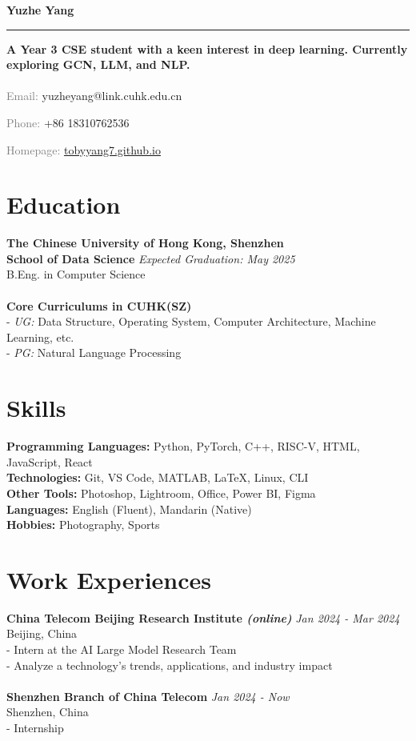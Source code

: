 \documentclass[a4paper,10pt]{article}
\newcommand{\name}[1]{\noindent\textbf{\LARGE #1}\vspace{0.5em}\hrule\vspace{1em}}
\newcommand{\contact}[2]{\noindent\textcolor{gray}{#1:} #2\par}
\begin{document}
\name{Yuzhe Yang}

\textbf{A Year 3 CSE student with a keen interest in deep learning. Currently exploring GCN, LLM, and NLP.\\}
\\
\contact{Email}{yuzheyang@link.cuhk.edu.cn}
\contact{Phone}{+86 18310762536}
\contact{Homepage}{\href{https://tobyyang7.github.io/}{tobyyang7.github.io}}

\section*{Education}
\textbf{The Chinese University of Hong Kong, Shenzhen\\ \textbf{School of Data Science}} \hfill \textit{Expected Graduation: May 2025}\\
B.Eng. in Computer Science\\
\\
\textbf{Core Curriculums in CUHK(SZ)}
\\- \textit{UG:} Data Structure, Operating System, Computer Architecture, Machine Learning, etc.
\\- \textit{PG:} Natural Language Processing


\section*{Skills}
\textbf{Programming Languages:} Python, PyTorch, C++, RISC-V, HTML, JavaScript, React\\
\textbf{Technologies:} Git, VS Code, MATLAB, \LaTeX, Linux, CLI\\
\textbf{Other Tools:} Photoshop, Lightroom, Office, Power BI, Figma\\
\textbf{Languages:} English (Fluent), Mandarin (Native)\\
\textbf{Hobbies:} Photography, Sports

\section*{Work Experiences}
\textbf{China Telecom Beijing Research Institute \textit{(online)}} \hfill \textit{Jan 2024 - Mar 2024}\\
Beijing, China\\
- Intern at the AI Large Model Research Team\\
- Analyze a technology's trends, applications, and industry impact\\
\\
\textbf{Shenzhen Branch of China Telecom} \hfill \textit{Jan 2024 - Now}\\
Shenzhen, China\\
- Internship
\end{document}
